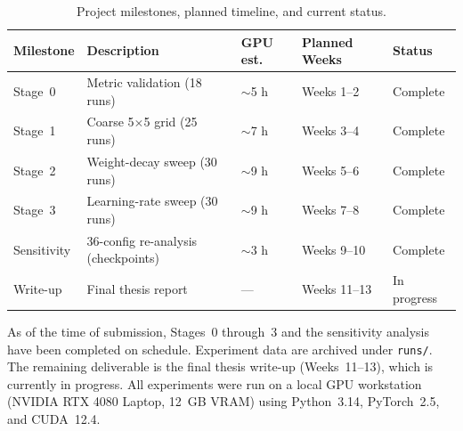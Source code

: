 \documentclass[12pt,openany,a4paper]{book}
\begin{document}
\begin{table}[htbp]
  \centering
  \caption{Project milestones, planned timeline, and current status.}
  \label{tab:milestones}
  \renewcommand{\arraystretch}{1.2}
  \begin{tabular}{lllll}
    \toprule
    Milestone & Description & GPU est. & Planned Weeks & Status \\
    \midrule
    Stage~0 & Metric validation (18 runs) & $\sim$5 h & Weeks 1--2 & Complete \\
    Stage~1 & Coarse 5$\times$5 grid (25 runs) & $\sim$7 h & Weeks 3--4 & Complete \\
    Stage~2 & Weight-decay sweep (30 runs) & $\sim$9 h & Weeks 5--6 & Complete \\
    Stage~3 & Learning-rate sweep (30 runs) & $\sim$9 h & Weeks 7--8 & Complete \\
    Sensitivity & 36-config re-analysis (checkpoints) & $\sim$3 h & Weeks 9--10 & Complete \\
    Write-up  & Final thesis report & --- & Weeks 11--13 & In progress \\
    \bottomrule
  \end{tabular}
\end{table}

As of the time of submission, Stages~0 through~3 and the sensitivity
analysis have been completed on schedule.
Experiment data are archived under \texttt{runs/}.
The remaining deliverable is the final thesis write-up (Weeks~11--13),
which is currently in progress.
All experiments were run on a local GPU workstation
(NVIDIA RTX 4080 Laptop, 12~GB VRAM) using
Python~3.14, PyTorch~2.5, and CUDA~12.4.
\end{document}
